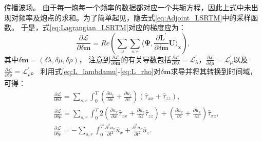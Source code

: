 传播波场。
由于每一炮每一个频率的数据都对应一个共轭方程，因此上式中未出现对频率及炮点的求和。为了简单起见，隐去式\eqref{eq:Adjoint_LSRTM}中的采样函数。
于是，式\eqref{eq:Lagrangian_LSRTM}对应的梯度应为：
\begin{equation}
    \frac{\partial\mathcal{L}}{\partial \delta\mathbf{m}}=Re\left(\sum_{\omega}\sum_{s,r}
	\langle\bm\Psi,\frac{\partial
		\mathbf{L}^{'}}{\partial\delta\mathbf{m}}\mathbf{U}\rangle_{\mathbf{x}}\right),
    \label{eq:Gradient_LSRTM}
\end{equation}
其中$\delta\mathbf{m}=(\delta\lambda, \delta\mu,\delta\rho)$，
注意到$\frac{\partial\mathcal{L}}{\partial \delta\mathbf{m}}$的有关导数包括$\frac{\partial\mathcal{L}}{\partial 
\delta\lambda}=\mathcal{L}^{'}_{\lambda}$，$\frac{\partial\mathcal{L}}{\partial\delta\mu}=\mathcal{L}^{'}_{\mu}$以及
$\frac{\partial\mathcal{L}}{\partial\delta\rho}=\mathcal{L}^{'}_{\rho}$。
利用式\eqref{eq:L_lambdamu}-\eqref{eq:L_rho}对$\delta\mathbf{m}$求导并将其转换到时间域，
可得：
\begin{equation}
\begin{split}
   & \frac{\partial\mathcal{L}}{\partial \delta\lambda}=\sum_{s,r}\int^T_{0}
	(\frac{\partial u_x}{\partial x}+\frac{\partial u_z}{\partial z})(\hat{\tau}_{xx}+\hat{\tau}_{zz}),\\
   & \frac{\partial\mathcal{L}}{\partial \delta\mu}=\sum_{s,r}\int^T_{0}
	2(\frac{\partial u_x}{\partial x}\hat{\tau}_{xx}+\frac{\partial u_z}{\partial z}\hat{\tau}_{zz})+
	(\frac{\partial u_x}{\partial z}+\frac{\partial u_x}{\partial z})\hat{\tau}_{xz},\\
   & \frac{\partial\mathcal{L}}{\partial \delta\rho}=-\sum_{s,r}\int^T_{0}
   \frac{\partial^2 u_x}{\partial t^2}\hat{u}_x+\frac{\partial^2 u_z}{\partial t^2}\hat{u}_{z}.
    \label{eq:Gradient_lambdamurho_LSRTM}
\end{split}
\end{equation}

